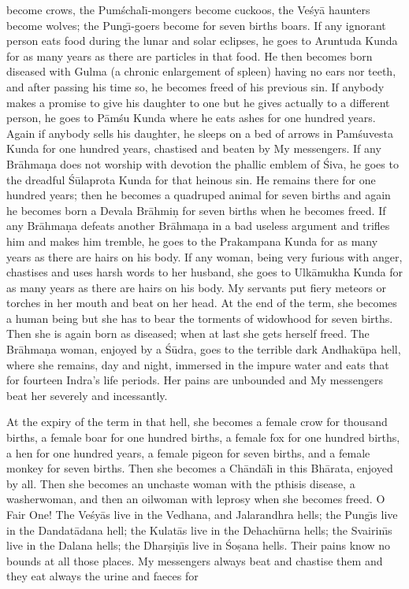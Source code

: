 become crows, the Pum\'schal\={\i}-mongers become cuckoos, the Ve\'sy\=a haunters become wolves; the Pung\={\i}-goers become for seven births boars. If any ignorant person eats food during the lunar and solar eclipses, he goes to Aruntuda Kunda for as many years as there are particles in that food. He then becomes born diseased with Gulma (a chronic enlargement of spleen) having no ears nor teeth, and after passing his time so, he becomes freed of his previous sin. If anybody makes a promise to give his daughter to one but he gives actually to a different person, he goes to P\=am\'su Kunda where he eats ashes for one hundred years. Again if anybody sells his daughter, he sleeps on a bed of arrows in Pam\'suvesta Kunda for one hundred years, chastised and beaten by My messengers. If any Br\=ahma\d{n}a does not worship with devotion the phallic emblem of \'Siva, he goes to the dreadful \'S\=ulaprota Kunda for that heinous sin. He remains there for one hundred years; then he becomes a quadruped animal for seven births and again he becomes born a Devala Br\=ahmi\d{n} for seven births when he becomes freed. If any Br\=ahma\d{n}a defeats another Br\=ahma\d{n}a in a bad useless argument and trifles him and makes him tremble, he goes to the Prakampana Kunda for as many years as there are hairs on his body. If any woman, being very furious with anger, chastises and uses harsh words to her husband, she goes to Ulk\=amukha Kunda for as many years as there are hairs on his body. My servants put fiery meteors or torches in her mouth and beat on her head. At the end of the term, she becomes a human being but she has to bear the torments of widowhood for seven births. Then she is again born as diseased; when at last she gets herself freed. The Br\=ahma\d{n}a woman, enjoyed by a \'S\=udra, goes to the terrible dark Andhak\=upa hell, where she remains, day and night, immersed in the impure water and eats that for fourteen Indra's life periods. Her pains are unbounded and My messengers beat her severely and incessantly.

At the expiry of the term in that hell, she becomes a female crow for thousand births, a female boar for one hundred births, a female fox for one hundred births, a hen for one hundred years, a female pigeon for seven births, and a female monkey for seven births. Then she becomes a Ch\=and\=al\={\i} in this Bh\=arata, enjoyed by all. Then she becomes an unchaste woman with the pthisis disease, a washerwoman, and then an oilwoman with leprosy when she becomes freed. O Fair One! The Ve\'sy\=as live in the Vedhana, and Jalarandhra hells; the Pung\={\i}s live in the Dandat\=adana hell; the Kulat\=as live in the Dehach\=urna hells; the Svairin\={\i}s live in the Dalana hells; the Dhar\d{s}i\d{n}\={\i}s live in \'So\d{s}ana hells. Their pains know no bounds at all those places. My messengers always beat and chastise them and they eat always the urine and faeces for

